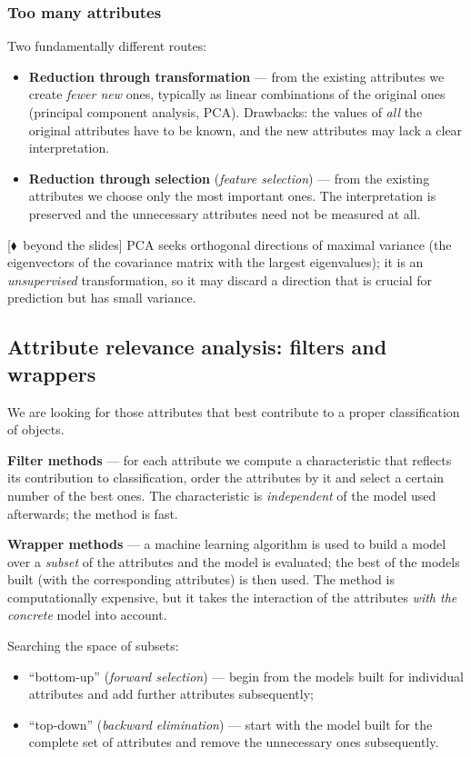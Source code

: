 \documentclass[11pt,a4paper]{article}
\theoremstyle{definition}
\providecommand{\uv}[1]{``#1''}
\newcommand{\mimo}{\textcolor{markcol}{\textsf{\footnotesize[$\blacklozenge$~beyond the slides]}}}
\begin{document}
\subsubsection{Too many attributes}

Two fundamentally different routes:

\begin{itemize}
\item \textbf{Reduction through transformation} --- from the existing attributes we create
      \emph{fewer new} ones, typically as linear combinations of the original ones (principal
      component analysis, PCA). Drawbacks: the values of \emph{all} the original attributes have
      to be known, and the new attributes may lack a clear interpretation.
\item \textbf{Reduction through selection} (\emph{feature selection}) --- from the existing
      attributes we choose only the most important ones. The interpretation is preserved and the
      unnecessary attributes need not be measured at all.
\end{itemize}

\mimo{} PCA seeks orthogonal directions of maximal variance (the eigenvectors of the covariance
matrix with the largest eigenvalues); it is an \emph{unsupervised} transformation, so it may
discard a direction that is crucial for prediction but has small variance.

\subsection{Attribute relevance analysis: filters and wrappers}
\label{ssec:filtr}

We are looking for those attributes that best contribute to a proper classification of objects.

\begin{defbox}
\textbf{Filter methods} --- for each attribute we compute a characteristic that reflects its
contribution to classification, order the attributes by it and select a certain number of the
best ones. The characteristic is \emph{independent} of the model used afterwards; the method is
fast.

\textbf{Wrapper methods} --- a machine learning algorithm is used to build a model over a
\emph{subset} of the attributes and the model is evaluated; the best of the models built (with
the corresponding attributes) is then used. The method is computationally expensive, but it takes
the interaction of the attributes \emph{with the concrete} model into account.

Searching the space of subsets:
\begin{itemize}
\item \uv{bottom-up} (\emph{forward selection}) --- begin from the models built for individual
      attributes and add further attributes subsequently;
\item \uv{top-down} (\emph{backward elimination}) --- start with the model built for the complete
      set of attributes and remove the unnecessary ones subsequently.
\end{itemize}
\end{defbox}
\end{document}
